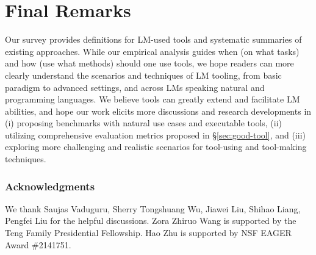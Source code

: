 \section{Final Remarks}
Our survey provides definitions for LM-used tools and systematic summaries of existing approaches. While our empirical analysis guides when (on what tasks) and how (use what methods) should one use tools, we hope readers can more clearly understand the scenarios and techniques of LM tooling, from basic paradigm to advanced settings, and across LMs speaking natural and programming languages. 
We believe tools can greatly extend and facilitate LM abilities, and hope our work elicits more discussions and research developments in %
(i) proposing benchmarks with natural use cases and executable tools, (ii) utilizing comprehensive evaluation metrics proposed in \S\ref{sec:good-tool}, and (iii) exploring more challenging and realistic scenarios for tool-using and tool-making techniques.



\subsubsection*{Acknowledgments}
We thank Saujas Vaduguru, Sherry Tongshuang Wu, Jiawei Liu, Shihao Liang, Pengfei Liu for the helpful discussions. Zora Zhiruo Wang is supported by the Teng Family Presidential Fellowship. Hao Zhu is supported by NSF EAGER Award \#2141751.